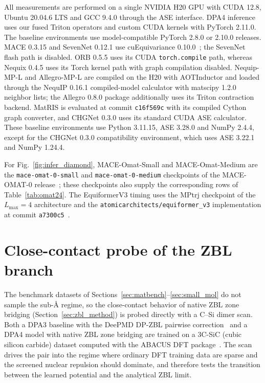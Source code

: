 All measurements are performed on a single NVIDIA H20 GPU with CUDA 12.8, Ubuntu 20.04.6 LTS and GCC 9.4.0 through the ASE interface.
DPA4 inference uses our fused Triton operators and custom CUDA kernels with PyTorch 2.11.0.
The baseline environments use model-compatible PyTorch 2.8.0 or 2.10.0 releases.
MACE 0.3.15 and SevenNet 0.12.1 use cuEquivariance 0.10.0~\cite{nvidia_cuequivariance}; the SevenNet flash path is disabled.
ORB 0.5.5 uses its CUDA \texttt{torch.compile} path, whereas Nequix 0.4.5 uses its Torch kernel path with graph compilation disabled.
Nequip-MP-L and Allegro-MP-L are compiled on the H20 with AOTInductor and loaded through the NequIP 0.16.1 compiled-model calculator with matscipy 1.2.0 neighbor lists; the Allegro 0.8.0 package additionally uses its Triton contraction backend.
MatRIS is evaluated at commit \texttt{c16f569c} with its compiled Cython graph converter, and CHGNet 0.3.0 uses its standard CUDA ASE calculator.
These baseline environments use Python 3.11.15, ASE 3.28.0 and NumPy 2.4.4, except for the CHGNet 0.3.0 compatibility environment, which uses ASE 3.22.1 and NumPy 1.24.4.

For Fig.~\ref{fig:infer_diamond}, MACE-Omat-Small and MACE-Omat-Medium are the \texttt{mace-omat-0-small} and \texttt{mace-omat-0-medium} checkpoints of the MACE-OMAT-0 release~\cite{batatia2025crosslearning}; these checkpoints also supply the corresponding rows of Table~\ref{tab:omat24}.
The EquiformerV3 timing uses the MPtrj checkpoint of the $L_{\max}=4$ architecture and the \texttt{atomicarchitects/equiformer\_v3} implementation at commit \texttt{a7300c5}~\cite{liao2026equiformerv3}.

\FloatBarrier
\section{Close-contact probe of the ZBL branch}
\label{sec:sm-zbl}

The benchmark datasets of Sections~\ref{sec:matbench}--\ref{sec:small_mol} do not sample the sub-\AA{} regime, so the close-contact behavior of native ZBL zone bridging (Section~\ref{sec:zbl_method}) is probed directly with a C--Si dimer scan.
Both a DPA3 baseline with the DeePMD DP-ZBL pairwise correction~\cite{wang2019dpzbl} and a DPA4 model with native ZBL zone bridging are trained on a 3C-SiC (cubic silicon carbide) dataset computed with the ABACUS DFT package~\cite{li2016abacus}.
The scan drives the pair into the regime where ordinary DFT training data are sparse and the screened nuclear repulsion should dominate, and therefore tests the transition between the learned potential and the analytical ZBL limit.

